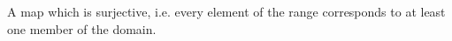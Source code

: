 A map which is surjective, i.e. every element of the range corresponds to at least
one member of the domain.
